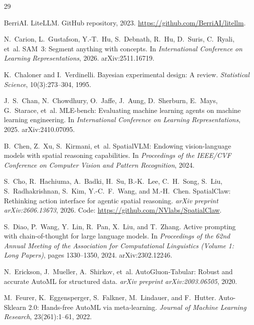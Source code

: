 \documentclass{article}
\begin{document}
\small
\begin{thebibliography}{29}

BerriAI. LiteLLM. GitHub repository, 2023. \url{https://github.com/BerriAI/litellm}.

N.~Carion, L.~Gustafson, Y.-T.~Hu, S.~Debnath, R.~Hu, D.~Suris, C.~Ryali, et~al. SAM~3: Segment anything with concepts. In \emph{International Conference on Learning Representations}, 2026. arXiv:2511.16719.

K.~Chaloner and I.~Verdinelli. Bayesian experimental design: A review. \emph{Statistical Science}, 10(3):273--304, 1995.

J.~S.~Chan, N.~Chowdhury, O.~Jaffe, J.~Aung, D.~Sherburn, E.~Mays, G.~Starace, et~al. MLE-bench: Evaluating machine learning agents on machine learning engineering. In \emph{International Conference on Learning Representations}, 2025. arXiv:2410.07095.

B.~Chen, Z.~Xu, S.~Kirmani, et~al. SpatialVLM: Endowing vision-language models with spatial reasoning capabilities. In \emph{Proceedings of the IEEE/CVF Conference on Computer Vision and Pattern Recognition}, 2024.

S.~Cho, R.~Hachiuma, A.~Badki, H.~Su, B.-K.~Lee, C.~H.~Song, S.~Liu, S.~Radhakrishnan, S.~Kim, Y.-C.~F.~Wang, and M.-H.~Chen. SpatialClaw: Rethinking action interface for agentic spatial reasoning. \emph{arXiv preprint arXiv:2606.13673}, 2026. Code: \url{https://github.com/NVlabs/SpatialClaw}.

S.~Diao, P.~Wang, Y.~Lin, R.~Pan, X.~Liu, and T.~Zhang. Active prompting with chain-of-thought for large language models. In \emph{Proceedings of the 62nd Annual Meeting of the Association for Computational Linguistics (Volume 1: Long Papers)}, pages 1330--1350, 2024. arXiv:2302.12246.

N.~Erickson, J.~Mueller, A.~Shirkov, et~al. AutoGluon-Tabular: Robust and accurate AutoML for structured data. \emph{arXiv preprint arXiv:2003.06505}, 2020.

M.~Feurer, K.~Eggensperger, S.~Falkner, M.~Lindauer, and F.~Hutter. Auto-Sklearn 2.0: Hands-free AutoML via meta-learning. \emph{Journal of Machine Learning Research}, 23(261):1--61, 2022.


\end{thebibliography}
\end{document}
